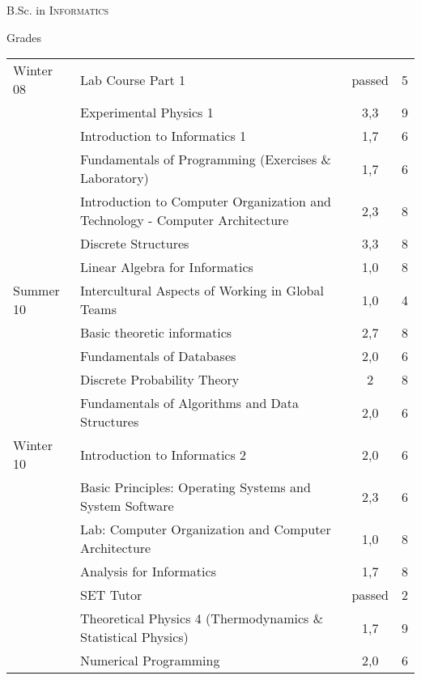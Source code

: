 \documentclass[a4paper,10pt]{article}
\begin{document}
\par{\centering\Large \hypertarget{grds_studies}{B.Sc. in \textsc{Informatics}}\par} \large{\centering Grades\par}\normalsize
\begin{center}

\tabletail{
}
\tablelasttail{}

 \begin{supertabular}{p{2.5cm} p{7.3cm} c c}

Winter 08& Lab Course Part 1& passed & 5 \\ 
&Experimental Physics 1& 3,3 & 9\\
& Introduction to Informatics 1& 1,7& 6 \\
& Fundamentals of Programming (Exercises \& Laboratory)& 1,7& 6 \\
& Introduction to Computer Organization and Technology - Computer Architecture& 2,3& 8 \\
& Discrete Structures& 3,3& 8 \\
& Linear Algebra for Informatics& 1,0& 8 \\  \hline

Summer 10& Intercultural Aspects of Working in Global Teams & 1,0& 4 \\
& Basic theoretic informatics& 2,7& 8 \\
& Fundamentals of Databases& 2,0& 6 \\
& Discrete Probability Theory & 2 & 8 \\
& Fundamentals of Algorithms and Data Structures& 2,0 & 6 \\ \hline

Winter 10& Introduction to Informatics 2& 2,0 & 6 \\
& Basic Principles: Operating Systems and System Software& 2,3 & 6 \\
& Lab: Computer Organization and Computer Architecture& 1,0 & 8 \\
& Analysis for Informatics & 1,7 & 8 \\
& SET Tutor & passed & 2 \\
& Theoretical Physics 4 (Thermodynamics \& Statistical Physics) & 1,7 & 9 \\
& Numerical Programming & 2,0 & 6 \\ \hline


\end{supertabular}
\end{center}
\end{document}
